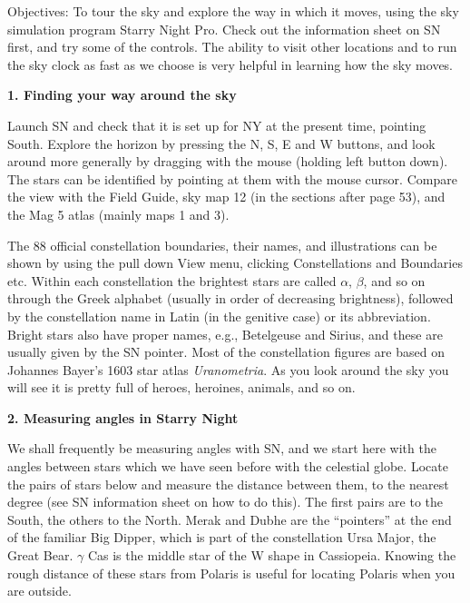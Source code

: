 
\noindent
{Objectives:} To tour the sky and explore the way in which it moves,
using the sky simulation program Starry Night Pro. Check out the
information sheet on SN first, and try some of the controls. The
ability to visit other locations and to run the sky clock as fast as
we choose is very helpful in learning how the sky moves.

\bigskip
\noindent
{\bf 1. Finding your way around the sky}

\medskip
\noindent
Launch SN and check that it is set up for NY at the present time,
pointing South.  Explore the horizon by pressing the N, S, E and W
buttons, and look around more generally by dragging with the mouse
(holding left button down). The stars can be identified by pointing at
them with the mouse cursor. Compare the view with the Field Guide, sky
map 12 (in the sections after page 53), and the Mag 5 atlas (mainly
maps 1 and 3).

The 88 official constellation boundaries, their names, and illustrations
can be shown by using the pull down View menu, clicking Constellations
and Boundaries etc. Within each constellation the brightest stars are
called $\alpha$, $\beta$, and so on through the Greek alphabet
(usually in order of decreasing brightness), followed by the
constellation name in Latin (in the genitive case) or its
abbreviation. Bright stars also have proper names, e.g., Betelgeuse
and Sirius, and these are usually given by the SN pointer. Most of the
constellation figures are based on Johannes Bayer's 1603 star atlas
\emph{Uranometria}. As you look around the sky you will see it is
pretty full of heroes, heroines, animals, and so on.


\bigskip
\noindent
{\bf 2. Measuring angles in Starry Night}

\medskip
\noindent

\noindent
We shall frequently be measuring angles with SN, and we start here
with the angles between stars which we have seen before with the
celestial globe. Locate the pairs of stars below and measure the
distance between them, to the nearest degree (see SN information sheet
on how to do this). The first pairs are to the South, the others to
the North. Merak and Dubhe are the ``pointers'' at the end of the
familiar Big Dipper, which is part of the constellation Ursa
Major, the Great Bear.  $\gamma$ Cas is the middle star of the W shape
in Cassiopeia. Knowing the rough distance of these stars from Polaris
is useful for locating Polaris when you are outside.
 
